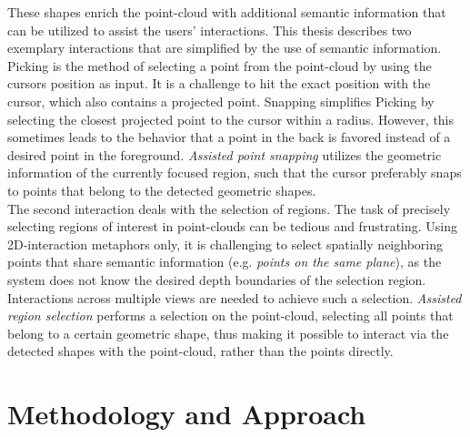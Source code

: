 \documentclass[]{article}
\begin{document}
These shapes enrich the point-cloud with additional semantic information that can be utilized to assist the users' interactions. This thesis describes two exemplary interactions that are simplified by the use of semantic information. 
\\
Picking is the method of selecting a point from the point-cloud by using the cursors position as input. It is a challenge to hit the exact position with the cursor, which also contains a projected point. Snapping simplifies Picking by selecting the closest projected point to the cursor within a radius. However, this sometimes leads to the behavior that a point in the back is favored instead of a desired point in the foreground. \textit{Assisted point snapping} utilizes the geometric information of the currently focused region, such that the cursor preferably snaps to points that belong to the detected geometric shapes. 
\\
The second interaction deals with the selection of regions. The task of precisely selecting regions of interest in point-clouds can be tedious and frustrating. Using 2D-interaction metaphors only, it is challenging to select spatially neighboring points that share semantic information (e.g. \textit{points on the same plane}), as the system does not know the desired depth boundaries of the selection region. Interactions across multiple views are needed to achieve such a selection. \textit{Assisted region selection} performs a selection on the point-cloud, selecting all points that belong to a certain geometric shape, thus making it possible to interact via the detected shapes with the point-cloud, rather than the points directly. 


\section{Methodology and Approach}
\end{document}
